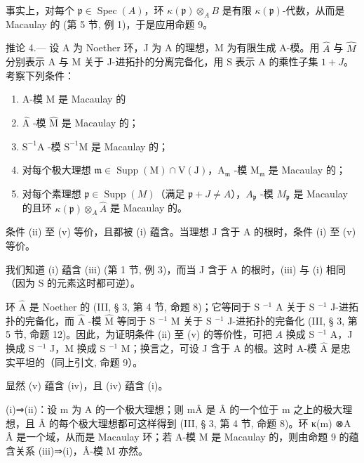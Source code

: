 事实上，对每个 \(\mathfrak{p} \in \operatorname{Spec}(A)\)，环 \(\kappa(\mathfrak{p}) \otimes_{A} B\) 是有限 \(\kappa(\mathfrak{p})\)-代数，从而是 Macaulay 的 (第 5 节, 例 1)，于是应用命题 9。

推论 4.--- 设 A 为 Noether 环，J 为 A 的理想，M 为有限生成 A-模。用 \(\hat{A}\) 与 \(\hat{M}\) 分别表示 A 与 M 关于 J-进拓扑的分离完备化，用 S 表示 A 的乘性子集 \(1 + J\)。考察下列条件：

\begin{enumerate}
\def\labelenumi{(\roman{enumi})}
\item
  A-模 M 是 Macaulay 的
\item
  \(\widehat{\mathrm{A}}\) -模 \(\widehat{\mathrm{M}}\) 是 Macaulay 的；
\item
  \(\mathrm{S}^{-1}\mathrm{A}\) -模 \(\mathrm{S}^{-1}\mathrm{M}\) 是 Macaulay 的；
\item
  对每个极大理想 \(\mathfrak{m} \in \operatorname{Supp}(\mathrm{M}) \cap \mathrm{V}(\mathrm{J})\)，\(\mathrm{A}_{\mathfrak{m}}\) -模 \(\mathrm{M}_{\mathfrak{m}}\) 是 Macaulay 的；
\item
  对每个素理想 \(\mathfrak{p} \in \operatorname{Supp}(M)\)（满足 \(\mathfrak{p} + J \neq A\)），\(A_{\mathfrak{p}}\) -模 \(M_{\mathfrak{p}}\) 是 Macaulay 的且环 \(\kappa(\mathfrak{p}) \otimes_{A} \widehat{A}\) 是 Macaulay 的。
\end{enumerate}

条件 (ii) 至 (v) 等价，且都被 (i) 蕴含。当理想 J 含于 A 的根时，条件 (i) 至 (v) 等价。

我们知道 (i) 蕴含 (iii) (第 1 节, 例 3)，而当 J 含于 A 的根时，(iii) 与 (i) 相同（因为 S 的元素这时都可逆）。

环 \(\widehat{\mathrm{A}}\) 是 Noether 的 (III, § 3, 第 4 节, 命题 8)；它等同于 S \(^{-1}\) A 关于 S \(^{-1}\) J-进拓扑的完备化，而 \(\widehat{\mathrm{A}}\) -模 \(\widehat{\mathrm{M}}\) 等同于 S \(^{-1}\) M 关于 S \(^{-1}\) J-进拓扑的完备化 (III, § 3, 第 5 节, 命题 12)。因此，为证明条件 (ii) 至 (v) 的等价性，可把 \(A\) 换成 S \(^{-1}\) A，J 换成 S \(^{-1}\) J，M 换成 S \(^{-1}\) M；换言之，可设 J 含于 A 的根。这时 A-模 \(\widehat{\mathrm{A}}\) 是忠实平坦的（同上引文, 命题 9）。

显然 (v) 蕴含 (iv)，且 (iv) 蕴含 (i)。

(i)⇒(ii)：设 m 为 A 的一个极大理想；则 mÂ 是 Â 的一个位于 m 之上的极大理想，且 Â 的每个极大理想都可这样得到 (III, § 3, 第 4 节, 命题 8)。环 κ(m) ⊗A Â 是一个域，从而是 Macaulay 环；若 A-模 M 是 Macaulay 的，则由命题 9 的蕴含关系 (iii)⇒(i)，Â-模 M 亦然。

